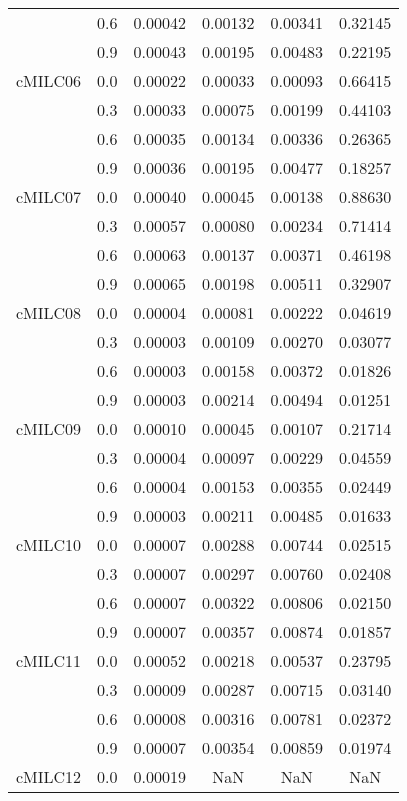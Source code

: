\begin{longtable}{cccccc}
        & 0.6 & 0.00042 & 0.00132 & 0.00341 & 0.32145 \\
        & 0.9 & 0.00043 & 0.00195 & 0.00483 & 0.22195 \\
cMILC06 & 0.0 & 0.00022 & 0.00033 & 0.00093 & 0.66415 \\
        & 0.3 & 0.00033 & 0.00075 & 0.00199 & 0.44103 \\
        & 0.6 & 0.00035 & 0.00134 & 0.00336 & 0.26365 \\
        & 0.9 & 0.00036 & 0.00195 & 0.00477 & 0.18257 \\
cMILC07 & 0.0 & 0.00040 & 0.00045 & 0.00138 & 0.88630 \\
        & 0.3 & 0.00057 & 0.00080 & 0.00234 & 0.71414 \\
        & 0.6 & 0.00063 & 0.00137 & 0.00371 & 0.46198 \\
        & 0.9 & 0.00065 & 0.00198 & 0.00511 & 0.32907 \\
cMILC08 & 0.0 & 0.00004 & 0.00081 & 0.00222 & 0.04619 \\
        & 0.3 & 0.00003 & 0.00109 & 0.00270 & 0.03077 \\
        & 0.6 & 0.00003 & 0.00158 & 0.00372 & 0.01826 \\
        & 0.9 & 0.00003 & 0.00214 & 0.00494 & 0.01251 \\
cMILC09 & 0.0 & 0.00010 & 0.00045 & 0.00107 & 0.21714 \\
        & 0.3 & 0.00004 & 0.00097 & 0.00229 & 0.04559 \\
        & 0.6 & 0.00004 & 0.00153 & 0.00355 & 0.02449 \\
        & 0.9 & 0.00003 & 0.00211 & 0.00485 & 0.01633 \\
cMILC10 & 0.0 & 0.00007 & 0.00288 & 0.00744 & 0.02515 \\
        & 0.3 & 0.00007 & 0.00297 & 0.00760 & 0.02408 \\
        & 0.6 & 0.00007 & 0.00322 & 0.00806 & 0.02150 \\
        & 0.9 & 0.00007 & 0.00357 & 0.00874 & 0.01857 \\
cMILC11 & 0.0 & 0.00052 & 0.00218 & 0.00537 & 0.23795 \\
        & 0.3 & 0.00009 & 0.00287 & 0.00715 & 0.03140 \\
        & 0.6 & 0.00008 & 0.00316 & 0.00781 & 0.02372 \\
        & 0.9 & 0.00007 & 0.00354 & 0.00859 & 0.01974 \\
cMILC12 & 0.0 & 0.00019 & NaN & NaN & NaN \\

\end{longtable}
